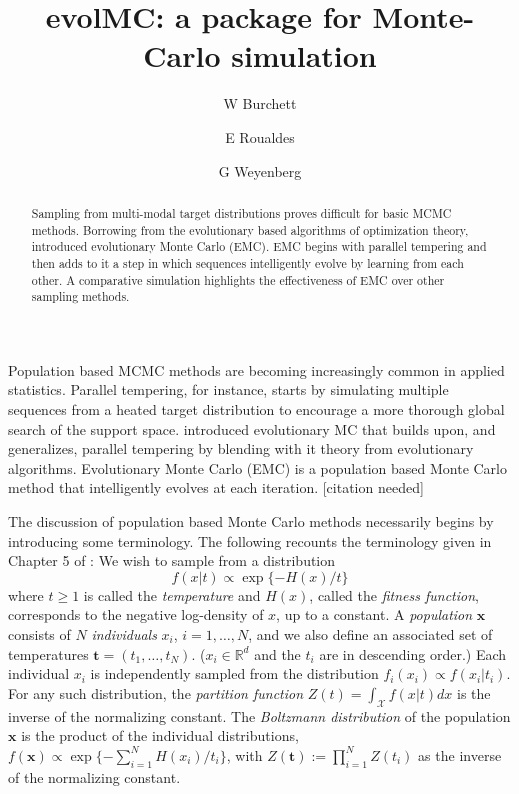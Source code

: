 \documentclass[12pt]{article}\usepackage[]{graphicx}\usepackage[]{color}
\title{evolMC: a package for Monte-Carlo simulation}
\author{W Burchett \and E Roualdes \and G Weyenberg}
\newcommand{\bx}{\mathbf x}
\newcommand{\bt}{\mathbf t}
\newcommand{\X}{\mathcal X}
\newcommand{\needcite}{{\color{red}[citation needed]}}
\begin{document}
\maketitle


\begin{abstract}
  Sampling from multi-modal target distributions proves difficult for
  basic MCMC methods.  Borrowing from the evolutionary based
  algorithms of optimization theory, \cite{liang2000evolutionary}
  introduced evolutionary Monte Carlo (EMC).  EMC begins with parallel
  tempering and then adds to it a step in which sequences
  intelligently evolve by learning from each other.  A comparative
  simulation highlights the effectiveness of EMC over other sampling
  methods.
\end{abstract}

\vspace{1cm}
\label{sec:introduction}

Population based MCMC methods are becoming increasingly common in
applied statistics.  Parallel tempering, for instance, starts by
simulating multiple sequences from a heated target distribution to
encourage a more thorough global search of the support space.
\cite{liang2000evolutionary} introduced evolutionary MC that builds
upon, and generalizes, parallel tempering by blending with it theory
from evolutionary algorithms. Evolutionary Monte Carlo (EMC) is a
population based Monte Carlo method that intelligently evolves at each
iteration. \needcite

The discussion of population based Monte Carlo methods necessarily
begins by introducing some terminology. The following recounts the
terminology given in Chapter 5 of \cite{liang2011advanced}: We wish to
sample from a distribution \[f(x|t) \propto \exp\{ -H(x)/t \}\] where
$t\ge 1$ is called the \emph{temperature} and $H(x)$, called the
\emph{fitness function}, corresponds to the negative log-density of
$x$, up to a constant. A \emph{population} $\mathbf{x}$ consists of
$N$ \emph{individuals} $x_i$, $i = 1, \ldots, N$, and we also define
an associated set of temperatures $\bt = (t_1,\ldots,t_N)$. ($x_i \in
\mathbb{R}^d$ and the $t_i$ are in descending order.) Each individual
$x_i$ is independently sampled from the distribution $f_i(x_i) \propto
f(x_i|t_i)$.  For any such distribution, the \emph{partition function}
$Z(t)= \int_\X f(x|t) dx$ is the inverse of the normalizing
constant. The \emph{Boltzmann distribution} of the population $\bx$ is the
product of the individual distributions, $f(\bx) \propto \exp \{ -\sum_{i=1}^N
H(x_i)/ t_i \}$, with $Z(\bt) := \prod_{i=1}^N Z(t_i)$ as the inverse
of the normalizing constant. 
\end{document}
